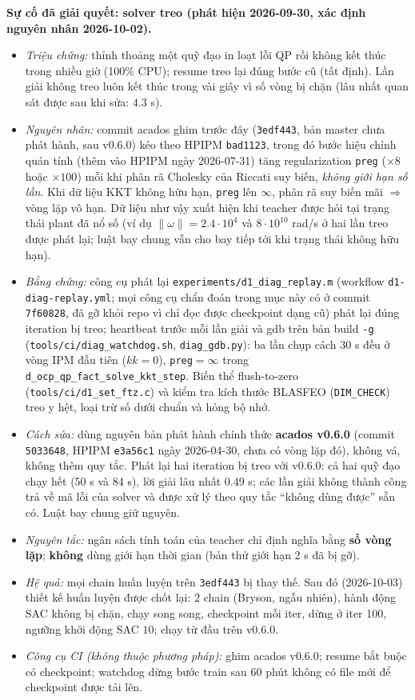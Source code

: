 \documentclass[11pt]{article}
\begin{document}
\noindent\textbf{Sự cố đã giải quyết: solver treo (phát hiện 2026-09-30, xác định nguyên nhân 2026-10-02).}
\begin{itemize}[leftmargin=1.4em,itemsep=1pt]
\item \emph{Triệu chứng:} thỉnh thoảng một quỹ đạo in loạt lỗi QP rồi không kết thúc trong nhiều giờ (100\% CPU); resume
treo lại đúng bước cũ (tất định). Lần giải không treo luôn kết thúc trong vài giây vì số vòng bị chặn (lâu nhất quan
sát được sau khi sửa: $4.3$ s).
\item \emph{Nguyên nhân:} commit acados ghim trước đây (\texttt{3edf443}, bản master chưa phát hành, sau v0.6.0) kéo theo
HPIPM \texttt{bad1123}, trong đó bước hiệu chỉnh quán tính (thêm vào HPIPM ngày 2026-07-31) tăng regularization
\texttt{preg} ($\times8$ hoặc $\times100$) mỗi khi phân rã Cholesky của Riccati suy biến, \emph{không giới hạn số lần}. Khi dữ
liệu KKT không hữu hạn, \texttt{preg} lên $\infty$, phân rã suy biến mãi $\Rightarrow$ vòng lặp vô hạn. Dữ liệu như vậy xuất
hiện khi teacher được hỏi tại trạng thái plant đã nổ số (ví dụ $\|\omega\|=2.4\cdot10^4$ và $8\cdot10^{10}$ rad/s ở hai lần treo
được phát lại; luật bay chung vẫn cho bay tiếp tới khi trạng thái không hữu hạn).
\item \emph{Bằng chứng:} công cụ phát lại \texttt{experiments/d1\_diag\_replay.m} (workflow \texttt{d1-diag-replay.yml}; mọi công
cụ chẩn đoán trong mục này có ở commit \texttt{7f60828}, đã gỡ khỏi repo vì chỉ đọc được checkpoint dạng cũ) phát lại đúng iteration
bị treo; heartbeat trước mỗi lần giải và gdb trên bản build \texttt{-g} (\texttt{tools/ci/diag\_watchdog.sh},
\texttt{diag\_gdb.py}): ba lần chụp cách 30 s đều ở vòng IPM đầu tiên ($kk=0$), \texttt{preg}$=\infty$ trong
\texttt{d\_ocp\_qp\_fact\_solve\_kkt\_step}. Biến thể flush-to-zero (\texttt{tools/ci/d1\_set\_ftz.c}) và kiểm tra kích thước
BLASFEO (\texttt{DIM\_CHECK}) treo y hệt, loại trừ số dưới chuẩn và hỏng bộ nhớ.
\item \emph{Cách sửa:} dùng nguyên bản phát hành chính thức \textbf{acados v0.6.0} (commit \texttt{5033648}, HPIPM
\texttt{e3a56c1} ngày 2026-04-30, chưa có vòng lặp đó), không vá, không thêm quy tắc. Phát lại hai iteration bị treo với
v0.6.0: cả hai quỹ đạo chạy hết (50 s và 84 s), lời giải lâu nhất 0.49 s; các lần giải không thành công trả về mã lỗi của
solver và được xử lý theo quy tắc ``không dùng được'' sẵn có. Luật bay chung giữ nguyên.
\item \emph{Nguyên tắc:} ngân sách tính toán của teacher chỉ định nghĩa bằng \textbf{số vòng lặp}; \textbf{không} dùng giới hạn
thời gian (bản thử giới hạn 2 s đã bị gỡ).
\item \emph{Hệ quả:} mọi chain huấn luyện trên \texttt{3edf443} bị thay thế. Sau đó (2026-10-03) thiết kế huấn luyện được
chốt lại: 2 chain (Bryson, ngẫu nhiên), hành động SAC không bị chặn, chạy song song, checkpoint mỗi iter, dừng ở
iter 100, ngưỡng khởi động SAC $10$; chạy từ đầu trên v0.6.0.
\item \emph{Công cụ CI (không thuộc phương pháp):} ghim acados v0.6.0; resume bắt buộc có checkpoint; watchdog dừng bước
train sau 60 phút không có file mới để checkpoint được tải lên.
\end{itemize}
\end{document}

